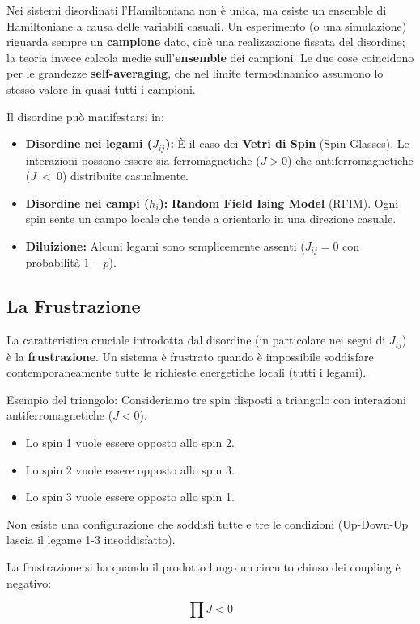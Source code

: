 Nei sistemi disordinati l'Hamiltoniana non è unica, ma esiste un ensemble di Hamiltoniane a causa delle variabili casuali. Un esperimento (o una simulazione) riguarda sempre un \textbf{campione} dato, cioè una realizzazione fissata del disordine; la teoria invece calcola medie sull'\textbf{ensemble} dei campioni. Le due cose coincidono per le grandezze \textbf{self-averaging}, che nel limite termodinamico assumono lo stesso valore in quasi tutti i campioni.

Il disordine può manifestarsi in:
\begin{itemize}
    \item \textbf{Disordine nei legami ($J_{ij}$):} È il caso dei \textbf{Vetri di Spin} (Spin Glasses). Le interazioni possono essere sia ferromagnetiche ($J>0$) che antiferromagnetiche ($J~<~0$) distribuite casualmente.
    \item \textbf{Disordine nei campi ($h_i$):} \textbf{Random Field Ising Model} (RFIM). Ogni spin sente un campo locale che tende a orientarlo in una direzione casuale.
    \item \textbf{Diluizione:} Alcuni legami sono semplicemente assenti ($J_{ij}=0$ con probabilità $1-p$).
\end{itemize}

\subsection{La Frustrazione}
La caratteristica cruciale introdotta dal disordine (in particolare nei segni di $J_{ij}$) è la \textbf{frustrazione}.
Un sistema è frustrato quando è impossibile soddisfare contemporaneamente tutte le richieste energetiche locali (tutti i legami).

Esempio del triangolo: Consideriamo tre spin disposti a triangolo con interazioni antiferromagnetiche ($J<0$).
\begin{itemize}
    \item Lo spin 1 vuole essere opposto allo spin 2.
    \item Lo spin 2 vuole essere opposto allo spin 3.
    \item Lo spin 3 vuole essere opposto allo spin 1.
\end{itemize}
Non esiste una configurazione che soddisfi tutte e tre le condizioni (Up-Down-Up lascia il legame 1-3 insoddisfatto).

\begin{tcolorbox}[colback=yellow!25, colframe=yellow!75!orange, coltitle=black, title=\textbf{Frustrazione}]
La frustrazione si ha quando il prodotto lungo un circuito chiuso dei coupling è negativo:

\begin{equation}
    \prod J <0
\end{equation}
\end{tcolorbox}


